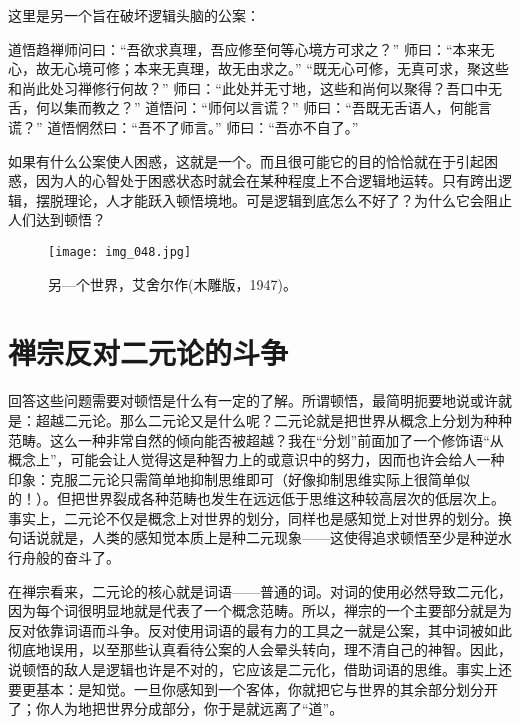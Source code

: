 这里是另一个旨在破坏逻辑头脑的公案：

\begin{zenkoan}
道悟趋禅师问曰：“吾欲求真理，吾应修至何等心境方可求之？”
师曰：“本来无心，故无心境可修；本来无真理，故无由求之。”
“既无心可修，无真可求，聚这些和尚此处习禅修行何故？”
师曰：“此处并无寸地，这些和尚何以聚得？吾口中无舌，何以集而教之？”
道悟问：“师何以言谎？”
师曰：“吾既无舌语人，何能言谎？”
道悟惘然曰：“吾不了师言。”
师曰：“吾亦不自了。”
\end{zenkoan}

如果有什么公案使人困惑，这就是一个。而且很可能它的目的恰恰就在于引起困惑，因为人的心智处于困惑状态时就会在某种程度上不合逻辑地运转。只有跨出逻辑，摆脱理论，人才能跃入顿悟境地。可是逻辑到底怎么不好了？为什么它会阻止人们达到顿悟？

\begin{figure}
\texttt{[image: img\_048.jpg]}
\caption[另一个世界，艾舍尔作。]
  {另—个世界，艾舍尔作(木雕版，1947)。}
\end{figure}

\section{禅宗反对二元论的斗争}

回答这些问题需要对顿悟是什么有一定的了解。所谓顿悟，最简明扼要地说或许就是：超越二元论。那么二元论又是什么呢？二元论就是把世界从概念上分划为种种范畴。这么一种非常自然的倾向能否被超越？我在“分划”前面加了一个修饰语“从概念上”，可能会让人觉得这是种智力上的或意识中的努力，因而也许会给人一种印象：克服二元论只需简单地抑制思维即可（好像抑制思维实际上很简单似的！）。但把世界裂成各种范畴也发生在远远低于思维这种较高层次的低层次上。事实上，二元论不仅是概念上对世界的划分，同样也是感知觉上对世界的划分。换句话说就是，人类的感知觉本质上是种二元现象——这使得追求顿悟至少是种逆水行舟般的奋斗了。

在禅宗看来，二元论的核心就是词语——普通的词。对词的使用必然导致二元化，因为每个词很明显地就是代表了一个概念范畴。所以，禅宗的一个主要部分就是为反对依靠词语而斗争。反对使用词语的最有力的工具之一就是公案，其中词被如此彻底地误用，以至那些认真看待公案的人会晕头转向，理不清自己的神智。因此，说顿悟的敌人是逻辑也许是不对的，它应该是二元化，借助词语的思维。事实上还要更基本：是知觉。一旦你感知到一个客体，你就把它与世界的其余部分划分开了；你人为地把世界分成部分，你于是就远离了“道”。

